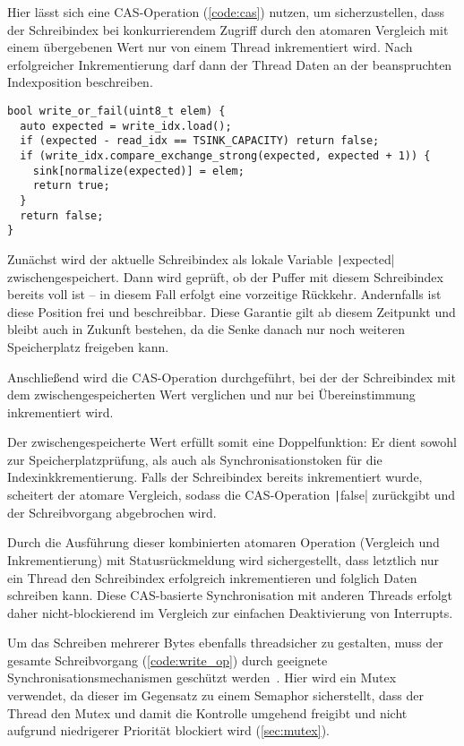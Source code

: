 Hier lässt sich eine \ac{CAS}-Operation (\ref{code:cas}) nutzen, um
sicherzustellen, dass der Schreibindex bei konkurrierendem Zugriff durch den
atomaren Vergleich mit einem übergebenen Wert nur von einem Thread inkrementiert
wird. Nach erfolgreicher Inkrementierung darf dann der Thread Daten an der
beanspruchten Indexposition beschreiben.

\begin{code}
\begin{verbatim}
bool write_or_fail(uint8_t elem) {
  auto expected = write_idx.load();
  if (expected - read_idx == TSINK_CAPACITY) return false;
  if (write_idx.compare_exchange_strong(expected, expected + 1)) {
    sink[normalize(expected)] = elem;
    return true;
  }
  return false;
}
\end{verbatim}
    \label{code:cas}
\end{code}

Zunächst wird der aktuelle Schreibindex als lokale Variable
\texttt|expected| zwischengespeichert. Dann wird geprüft, ob der Puffer
mit diesem Schreibindex bereits voll ist -- in diesem Fall erfolgt eine
vorzeitige Rückkehr. Andernfalls ist diese Position frei und beschreibbar. Diese
Garantie gilt ab diesem Zeitpunkt und bleibt auch in Zukunft bestehen, da die
Senke danach nur noch weiteren Speicherplatz freigeben kann.

Anschließend wird die CAS-Operation durchgeführt, bei der der Schreibindex mit
dem zwischengespeicherten Wert verglichen und nur bei Übereinstimmung
inkrementiert wird.

Der zwischengespeicherte Wert erfüllt somit eine Doppelfunktion: Er dient sowohl
zur Speicherplatzprüfung, als auch als Synchronisationstoken für die
Indexinkkrementierung. Falls der Schreibindex bereits inkrementiert wurde,
scheitert der atomare Vergleich, sodass die CAS-Operation
\texttt|false| zurückgibt und der Schreibvorgang abgebrochen wird.

Durch die Ausführung dieser kombinierten atomaren Operation (Vergleich und
Inkrementierung) mit Statusrückmeldung wird sichergestellt, dass letztlich nur
ein Thread den Schreibindex erfolgreich inkrementieren und folglich Daten
schreiben kann. Diese CAS-basierte Synchronisation mit anderen Threads erfolgt
daher nicht-blockierend im Vergleich zur einfachen Deaktivierung von Interrupts.

Um das Schreiben mehrerer Bytes ebenfalls threadsicher zu gestalten, muss der
gesamte Schreibvorgang (\ref{code:write_op}) durch geeignete
Synchronisationsmechanismen geschützt werden~\cite{FreeRTOSForumPrintf}. Hier
wird ein Mutex verwendet, da dieser im Gegensatz zu einem Semaphor sicherstellt,
dass der Thread den Mutex und damit die Kontrolle umgehend freigibt und nicht
aufgrund niedrigerer Priorität blockiert wird (\ref{sec:mutex}).

